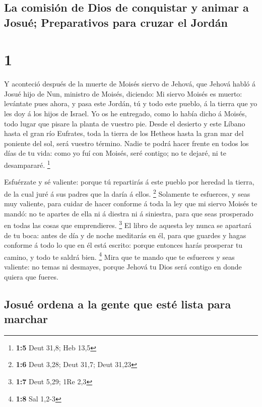 \hypertarget{la-comisiuxf3n-de-dios-de-conquistar-y-animar-a-josuuxe9-preparativos-para-cruzar-el-jorduxe1n}{%
\subsection{La comisión de Dios de conquistar y animar a Josué;
Preparativos para cruzar el
Jordán}\label{la-comisiuxf3n-de-dios-de-conquistar-y-animar-a-josuuxe9-preparativos-para-cruzar-el-jorduxe1n}}

\hypertarget{section}{%
\section{1}\label{section}}

 Y aconteció después de la muerte de Moisés siervo de
Jehová, que Jehová habló á Josué hijo de Nun, ministro de Moisés,
diciendo:  Mi siervo Moisés es muerto: levántate pues
ahora, y pasa este Jordán, tú y todo este pueblo, á la tierra que yo les
doy á los hijos de Israel.  Yo os he entregado, como lo
había dicho á Moisés, todo lugar que pisare la planta de vuestro pie.
 Desde el desierto y este Líbano hasta el gran río
Eufrates, toda la tierra de los Hetheos hasta la gran mar del poniente
del sol, será vuestro término.  Nadie te podrá hacer
frente en todos los días de tu vida: como yo fuí con Moisés, seré
contigo; no te dejaré, ni te desampararé. \footnote{\textbf{1:5} Deut
  31,8; Heb 13,5}

 Esfuérzate y sé valiente: porque tú repartirás á este
pueblo por heredad la tierra, de la cual juré á sus padres que la daría
á ellos. \footnote{\textbf{1:6} Deut 3,28; Deut 31,7; Deut 31,23}
 Solamente te esfuerces, y seas muy valiente, para cuidar
de hacer conforme á toda la ley que mi siervo Moisés te mandó: no te
apartes de ella ni á diestra ni á siniestra, para que seas prosperado en
todas las cosas que emprendieres. \footnote{\textbf{1:7} Deut 5,29; 1Re
  2,3}  El libro de aquesta ley nunca se apartará de tu
boca: antes de día y de noche meditarás en él, para que guardes y hagas
conforme á todo lo que en él está escrito: porque entonces harás
prosperar tu camino, y todo te saldrá bien. \footnote{\textbf{1:8} Sal
  1,2-3}  Mira que te mando que te esfuerces y seas
valiente: no temas ni desmayes, porque Jehová tu Dios será contigo en
donde quiera que fueres.

\hypertarget{josuuxe9-ordena-a-la-gente-que-estuxe9-lista-para-marchar}{%
\subsection{Josué ordena a la gente que esté lista para
marchar}\label{josuuxe9-ordena-a-la-gente-que-estuxe9-lista-para-marchar}}

